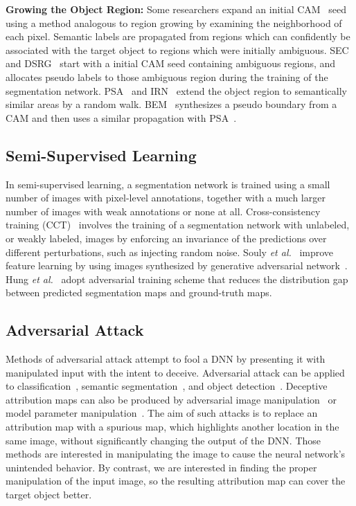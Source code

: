 \documentclass[final]{cvpr}
\begin{document}
\textbf{Growing the Object Region:}
Some researchers expand an initial CAM~\cite{zhou2016learning} seed using a method analogous to region growing by examining the neighborhood of each pixel.
Semantic labels are propagated from regions which can confidently be associated with the target object to regions which were initially ambiguous.
SEC~\cite{kolesnikov2016seed} and DSRG~\cite{huang2018weakly} start with a initial CAM seed containing ambiguous regions, and allocates pseudo labels to those ambiguous region during the training of the segmentation network. 
PSA~\cite{ahn2018learning} and IRN~\cite{ahn2019weakly} extend the object region to semantically similar areas by a random walk.
BEM~\cite{chenweakly} synthesizes a pseudo boundary from a CAM and then uses a similar propagation with PSA~\cite{ahn2018learning}.


\subsection{Semi-Supervised Learning}\label{re_semi}
In semi-supervised learning, a segmentation network is trained using a small number of images with pixel-level annotations, together with a much larger number of images with weak annotations or none at all.
Cross-consistency training (CCT)~\cite{ouali2020semi} involves the training of a segmentation network with unlabeled, or weakly labeled, images by enforcing an invariance of the predictions over different perturbations, such as injecting random noise.
Souly \textit{et al.}~\cite{souly2017semi} improve feature learning by using images synthesized by generative adversarial network~\cite{goodfellow2014generative}.
Hung \textit{et al.}~\cite{hung2019adversarial} adopt adversarial training scheme that reduces the distribution gap between predicted segmentation maps and ground-truth maps.




\subsection{Adversarial Attack}\label{adv_manipulation}
Methods of adversarial attack attempt to fool a DNN by presenting it with manipulated input with the intent to deceive.
Adversarial attack can be applied to classification~\cite{goodfellow2014explaining, moosavi2016deepfool}, semantic segmentation~\cite{arnab2018robustness}, and object detection~\cite{xie2017adversarial}.
Deceptive attribution maps can also be produced by adversarial image manipulation~\cite{dombrowski2019explanations} or model parameter manipulation~\cite{heo2019fooling}.
The aim of such attacks is to replace an attribution map with a spurious map, which highlights another location in the same image, without significantly changing the output of the DNN.
Those methods are interested in manipulating the image to cause the neural network's unintended behavior. 
By contrast, we are interested in finding the proper manipulation of the input image, so the resulting attribution map can cover the target object better.
\end{document}
